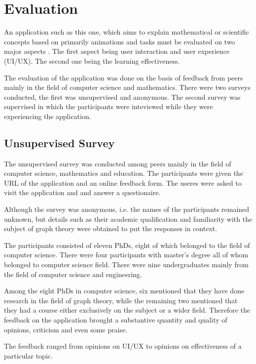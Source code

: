 
\section{Evaluation}

An application such as this one, which aims to explain mathematical or
scientific concepts based on primarily animations and tasks must be evaluated
on two major aspects . The first aspect being user interaction and user
experience (UI/UX). The second one being the learning effectiveness.


The evaluation of the application was done on the basis of feedback from peers
mainly in the field of computer science and mathematics. There were two surveys
conducted, the first was unsupervised and anonymous. The second survey was
supervised in which the participants were inteviewed while they were
experiencing the application.

\subsection{Unsupervised Survey}
The unsupervised survey was conducted among peers mainly in the field of
computer science, mathematics and education. The participants were given the
URL of the application and an online feedback form. The useres were asked to
visit the application and and answer a questionaire.

Although the survey was anonymous, i.e. the names of the participants remained
unknown, but details such as their academic qualification and familiarity with
the subject of graph theory were obtained to put the responses in context.

The participants consisted of eleven PhDs, eight of which belonged to the field
of computer science. There were four participants with master's degree all of
whom belonged to computer science field. There were nine undergraduates mainly
from the field of computer science and engineering.

Among the eight PhDs in computer science, six mentioned that they have done
research in the field of graph theory, while the remaining two mentioned that
they had a course either exclusively on the subject or a wider field.
Therefore the feedback on the application brought a substantive quantity and
quality of opinions, criticism and even some praise.

The feedback ranged from opinions on UI/UX to 
opinions on effectiveness of a particular topic.

